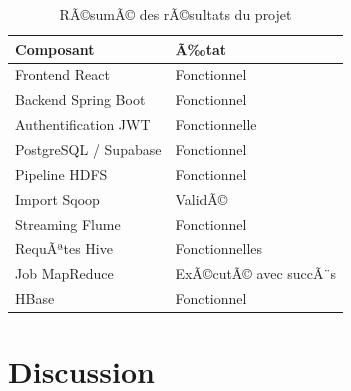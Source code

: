 ﻿\documentclass[12pt,a4paper]{report}
\begin{document}
\begin{table}[H]
    \centering
    \caption{RÃ©sumÃ© des rÃ©sultats du projet}

    \begin{tabular}{|p{6cm}|p{5cm}|}
        \hline
        \textbf{Composant} & \textbf{Ã‰tat} \\
        \hline

        Frontend React &
        Fonctionnel \\
        
        \hline

        Backend Spring Boot &
        Fonctionnel \\
        
        \hline

        Authentification JWT &
        Fonctionnelle \\
        
        \hline

        PostgreSQL / Supabase &
        Fonctionnel \\
        
        \hline

        Pipeline HDFS &
        Fonctionnel \\
        
        \hline

        Import Sqoop &
        ValidÃ© \\
        
        \hline

        Streaming Flume &
        Fonctionnel \\
        
        \hline

        RequÃªtes Hive &
        Fonctionnelles \\
        
        \hline

        Job MapReduce &
        ExÃ©cutÃ© avec succÃ¨s \\
        
        \hline

        HBase &
        Fonctionnel \\
        
        \hline
    \end{tabular}
\end{table}

\section{Discussion}
\end{document}

